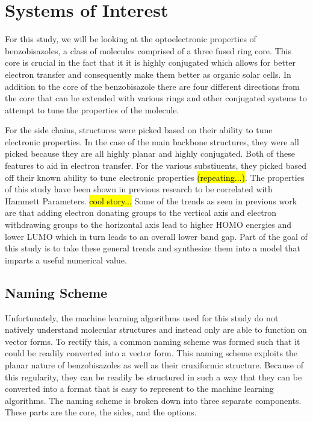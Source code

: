 \documentclass[10pt]{article}
\begin{document}
\section{Systems of Interest}

For this study, we will be looking at the optoelectronic properties of benzobisazoles, a class of molecules comprised of a three fused ring core. This core is crucial in the fact that it it is highly conjugated which allows for better electron transfer and consequently make them better as organic solar cells. In addition to the core of the benzobisazole there are four different directions from the core that can be extended with various rings and other conjugated systems to attempt to tune the properties of the molecule.

For the side chains, structures were picked based on their ability to tune electronic properties. In the case of the main backbone structures, they were all picked because they are all highly planar and highly conjugated. Both of these features to aid in electron transfer. For the various substiuents, they picked based off their known ability to tune electronic properties \hl{(repeating...)}. The properties of this study have been shown in previous research to be correlated with Hammett Parameters. \hl{cool story...} Some of the trends as seen in previous work are that adding electron donating groups to the vertical axis and electron withdrawing  groups to the horizontal axis lead to higher HOMO energies and lower LUMO which in turn leads to an overall lower band gap. Part of the goal of this study is to take these general trends and synthesize them into a model that imparts a useful numerical value.

\subsection{Naming Scheme}

Unfortunately, the machine learning algorithms used for this study do not natively understand molecular structures and instead only are able to function on vector forms. To rectify this, a common naming scheme was formed such that it could be readily converted into a vector form. This naming scheme exploits the planar nature of benzobisazoles as well as their cruxiformic structure. Because of this regularity, they can be readily be structured in such a way that they can be converted into a format that is easy to represent to the machine learning algorithms. The naming scheme is broken down into three separate components. These parts are the core, the sides, and the options.
\end{document}
